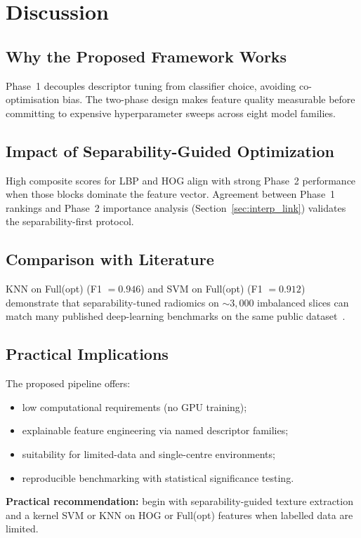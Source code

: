 \section{Discussion}
\label{sec:discussion}

\subsection{Why the Proposed Framework Works}
\label{sec:disc_framework}
Phase~1 decouples descriptor tuning from classifier choice, avoiding co-optimisation bias.
The two-phase design makes feature quality measurable before committing to expensive hyperparameter sweeps across eight model families.

\subsection{Impact of Separability-Guided Optimization}
\label{sec:disc_separability}
High composite scores for LBP and HOG align with strong Phase~2 performance when those blocks dominate the feature vector.
Agreement between Phase~1 rankings and Phase~2 importance analysis (Section~\ref{sec:interp_link}) validates the separability-first protocol.

\subsection{Comparison with Literature}
\label{sec:disc_literature}
KNN on Full(opt) (F1 $=0.946$) and SVM on Full(opt) (F1 $=0.912$) demonstrate that separability-tuned radiomics on $\sim3{,}000$ imbalanced slices can match many published deep-learning benchmarks on the same public dataset~\cite{kumar2024,ottoni2025,basthikodi2024}.

\subsection{Practical Implications}
\label{sec:disc_practical}
The proposed pipeline offers:
\begin{itemize}
    \item low computational requirements (no GPU training);
    \item explainable feature engineering via named descriptor families;
    \item suitability for limited-data and single-centre environments;
    \item reproducible benchmarking with statistical significance testing.
\end{itemize}
\textbf{Practical recommendation:} begin with separability-guided texture extraction and a kernel SVM or KNN on HOG or Full(opt) features when labelled data are limited.
